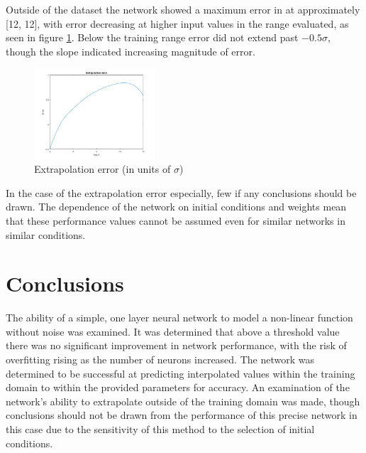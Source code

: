 \documentclass{IEEEtran}
\begin{document}
Outside of the dataset the network showed a maximum error in at approximately [12, 12], with error decreasing at higher input values in the range evaluated, as seen in figure \ref{fig:extrap_error}. Below the training range error did not extend past $-0.5\sigma$, though the slope indicated increasing magnitude of error.

\begin{centering}
\begin{figure}
\begin{center}
	\includegraphics[width=0.4\textwidth]{extrap_error}
	\caption{Extrapolation error (in units of $\sigma$) \label{fig:extrap_error}}
\end{center}
\end{figure}
\end{centering}

In the case of the extrapolation error especially, few if any conclusions should be drawn. The dependence of the network on initial conditions and weights mean that these performance values cannot be assumed even for similar networks in similar conditions.

\section{Conclusions}
The ability of a simple, one layer neural network to model a non-linear function without noise was examined. It was determined that above a threshold value there was no significant improvement in network performance, with the risk of overfitting rising as the number of neurons increased. The network was determined to be successful at predicting interpolated values within the training domain to within the provided parameters for accuracy. An examination of the network's ability to extrapolate outside of the training domain was made, though conclusions should not be drawn from the performance of this precise network in this case due to the sensitivity of this method to the selection of initial conditions.
\end{document}

